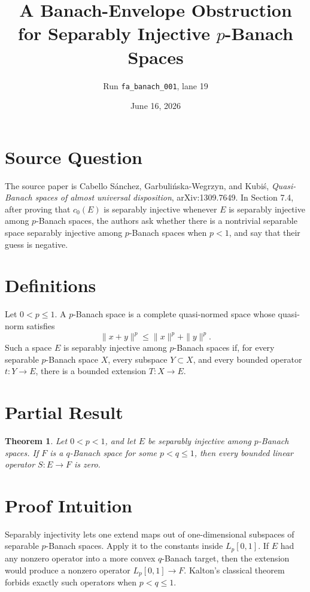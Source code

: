 \documentclass[11pt]{article}
\title{A Banach-Envelope Obstruction for Separably Injective \(p\)-Banach Spaces}
\author{Run \texttt{fa\_banach\_001}, lane 19}
\date{June 16, 2026}
\newtheorem{theorem}{Theorem}
\begin{document}
\maketitle

\section*{Source Question}

The source paper is Cabello S\'anchez, Garbuli\'nska-Wegrzyn, and Kubi\'s,
\emph{Quasi-Banach spaces of almost universal disposition},
arXiv:1309.7649.  In Section 7.4, after proving that \(c_0(E)\) is
separably injective whenever \(E\) is separably injective among \(p\)-Banach
spaces, the authors ask whether there is a nontrivial separable space
separably injective among \(p\)-Banach spaces when \(p<1\), and say that their
guess is negative.

\section*{Definitions}

Let \(0<p\leq 1\). A \(p\)-Banach space is a complete quasi-normed space whose
quasi-norm satisfies
\[
  \|x+y\|^p \leq \|x\|^p+\|y\|^p .
\]
Such a space \(E\) is separably injective among \(p\)-Banach spaces if, for
every separable \(p\)-Banach space \(X\), every subspace \(Y\subset X\), and
every bounded operator \(t:Y\to E\), there is a bounded extension
\(T:X\to E\).

\section*{Partial Result}

\begin{theorem}
Let \(0<p<1\), and let \(E\) be separably injective among \(p\)-Banach spaces.
If \(F\) is a \(q\)-Banach space for some \(p<q\leq 1\), then every bounded
linear operator \(S:E\to F\) is zero.
\end{theorem}

\section*{Proof Intuition}

Separably injectivity lets one extend maps out of one-dimensional subspaces of
separable \(p\)-Banach spaces.  Apply it to the constants inside
\(L_p[0,1]\).  If \(E\) had any nonzero operator into a more convex
\(q\)-Banach target, then the extension would produce a nonzero operator
\(L_p[0,1]\to F\).  Kalton's classical theorem forbids exactly such operators
when \(p<q\leq 1\).
\end{document}
